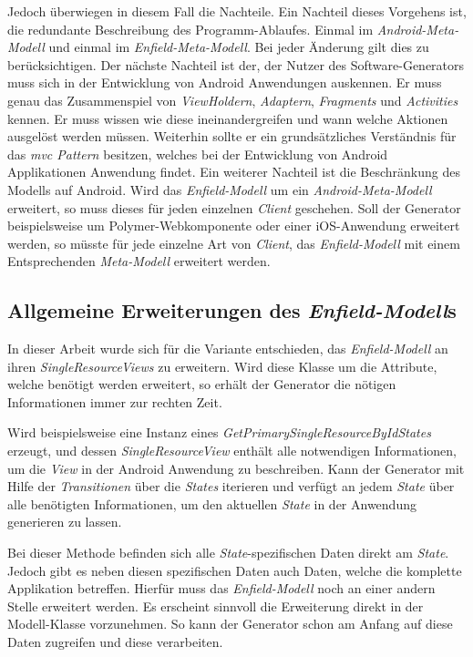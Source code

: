 Jedoch überwiegen in diesem Fall die Nachteile. Ein Nachteil dieses Vorgehens ist, die redundante Beschreibung des Programm-Ablaufes. Einmal im \textit{Android-Meta-Modell} und einmal im \textit{Enfield-Meta-Modell}. Bei jeder Änderung gilt dies zu berücksichtigen. 
Der nächste Nachteil ist der, der Nutzer des Software-Generators muss sich in der Entwicklung von Android Anwendungen auskennen. Er muss genau das Zusammenspiel von \textit{ViewHoldern}, \textit{Adaptern}, \textit{Fragments} und \textit{Activities} kennen. Er muss wissen wie diese ineinandergreifen und wann welche Aktionen ausgelöst werden müssen. Weiterhin sollte er ein grundsätzliches Verständnis für das \textit{\acf{mvc} Pattern} besitzen, welches bei der Entwicklung von Android Applikationen Anwendung findet.
Ein weiterer Nachteil ist die Beschränkung des Modells auf Android. Wird das \textit{Enfield-Modell} um ein \textit{Android-Meta-Modell} erweitert, so muss dieses für jeden einzelnen \textit{Client} geschehen. Soll der Generator beispielsweise um Polymer-Webkomponente oder einer iOS-Anwendung erweitert werden, so müsste für jede einzelne Art von \textit{Client}, das \textit{Enfield-Modell} mit einem Entsprechenden \textit{Meta-Modell} erweitert werden.

\subsection{Allgemeine Erweiterungen des \textit{Enfield-Modell}s}

In dieser Arbeit wurde sich für die Variante entschieden, das \textit{Enfield-Modell} an ihren \textit{SingleResourceViews} zu erweitern.
Wird diese Klasse um die  Attribute, welche benötigt werden erweitert, so erhält der Generator die nötigen Informationen immer zur rechten Zeit.

Wird beispielsweise eine Instanz eines \textit{GetPrimarySingleResourceByIdStates} erzeugt, und dessen \textit{SingleResourceView} enthält alle notwendigen Informationen, um die \textit{View} in der Android Anwendung zu beschreiben. Kann der Generator mit Hilfe der \textit{Transitionen} über die \textit{States} iterieren und verfügt an jedem \textit{State} über alle benötigten Informationen, um den aktuellen \textit{State} in der Anwendung generieren zu lassen.

Bei dieser Methode befinden sich alle \textit{State}-spezifischen Daten direkt am \textit{State}. Jedoch gibt es neben diesen spezifischen Daten auch Daten, welche die komplette Applikation betreffen. Hierfür muss das \textit{Enfield-Modell} noch an einer andern Stelle erweitert werden. 
Es erscheint sinnvoll die Erweiterung direkt in der Modell-Klasse vorzunehmen. So kann der Generator schon am Anfang auf diese Daten zugreifen und diese verarbeiten.

